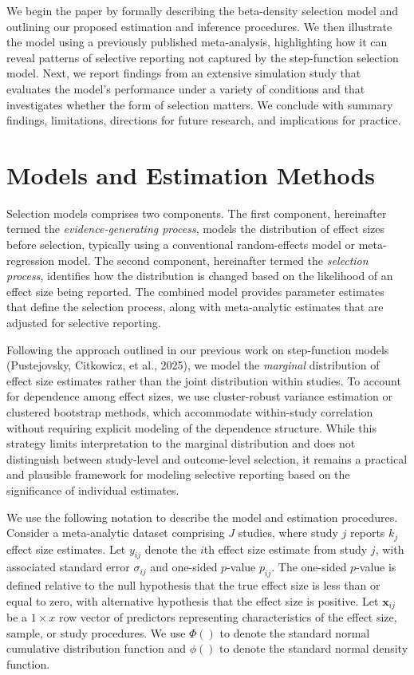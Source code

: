 \documentclass[
  american,
  man, donotrepeattitle,floatsintext]{apa7}
\begin{document}
We begin the paper by formally describing the beta-density selection model and outlining our proposed estimation and inference procedures. We then illustrate the model using a previously published meta-analysis, highlighting how it can reveal patterns of selective reporting not captured by the step-function selection model. Next, we report findings from an extensive simulation study that evaluates the model's performance under a variety of conditions and that investigates whether the form of selection matters. We conclude with summary findings, limitations, directions for future research, and implications for practice.

\section{Models and Estimation Methods}\label{model-and-estimation}

Selection models comprises two components. The first component, hereinafter termed the \emph{evidence-generating process}, models the distribution of effect sizes before selection, typically using a conventional random-effects model or meta-regression model. The second component, hereinafter termed the \emph{selection process}, identifies how the distribution is changed based on the likelihood of an effect size being reported. The combined model provides parameter estimates that define the selection process, along with meta-analytic estimates that are adjusted for selective reporting.

Following the approach outlined in our previous work on step-function models (Pustejovsky, Citkowicz, et al., 2025), we model the \emph{marginal} distribution of effect size estimates rather than the joint distribution within studies. To account for dependence among effect sizes, we use cluster-robust variance estimation or clustered bootstrap methods, which accommodate within-study correlation without requiring explicit modeling of the dependence structure. While this strategy limits interpretation to the marginal distribution and does not distinguish between study-level and outcome-level selection, it remains a practical and plausible framework for modeling selective reporting based on the significance of individual estimates.

We use the following notation to describe the model and estimation procedures. Consider a meta-analytic dataset comprising \(J\) studies, where study \(j\) reports \(k_j\) effect size estimates. Let \(y_{ij}\) denote the \(i\)th effect size estimate from study \(j\), with associated standard error \(\sigma_{ij}\) and one-sided \(p\)-value \(p_{ij}\). The one-sided \(p\)-value is defined relative to the null hypothesis that the true effect size is less than or equal to zero, with alternative hypothesis that the effect size is positive. Let \(\mathbf{x}_{ij}\) be a \(1 \times x\) row vector of predictors representing characteristics of the effect size, sample, or study procedures. We use \(\Phi()\) to denote the standard normal cumulative distribution function and \(\phi()\) to denote the standard normal density function.
\end{document}
